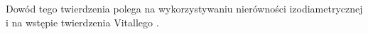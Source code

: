 Dowód tego twierdzenia polega na wykorzystywaniu nierówności izodiametrycznej \citep[2.10.3]{Federer} 
i na wstępie twierdzenia Vitallego \citep[2.8.18]{Federer}.